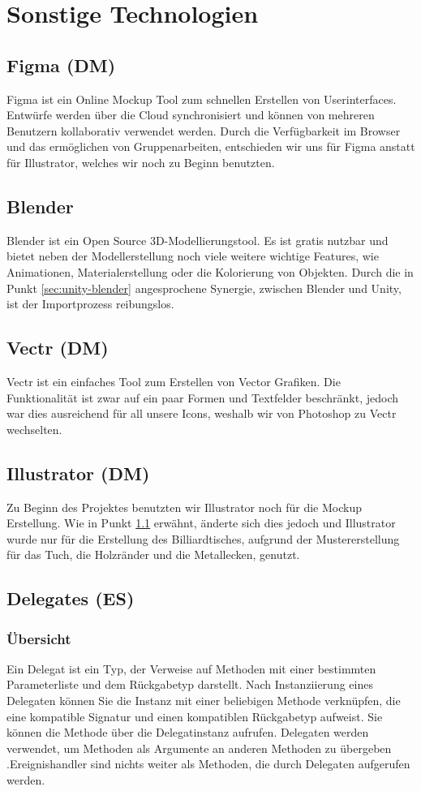 \section{Sonstige Technologien}
\subsection{Figma (DM)} \label{sec:figma}
Figma ist ein Online Mockup Tool zum schnellen Erstellen von Userinterfaces. Entwürfe werden über die Cloud synchronisiert und können von mehreren Benutzern kollaborativ verwendet werden. Durch die Verfügbarkeit im Browser und das ermöglichen von Gruppenarbeiten, entschieden wir uns für Figma anstatt für Illustrator, welches wir noch zu Beginn benutzten.
\subsection{Blender}
Blender ist ein Open Source 3D-Modellierungstool. Es ist gratis nutzbar und bietet neben der Modellerstellung noch viele weitere wichtige Features, wie Animationen, Materialerstellung oder die Kolorierung von Objekten. Durch die in Punkt \ref{sec:unity-blender} angesprochene Synergie, zwischen Blender und Unity, ist der Importprozess reibungslos.
\subsection{Vectr (DM)}
Vectr ist ein einfaches Tool zum Erstellen von Vector Grafiken. Die Funktionalität ist zwar auf ein paar Formen und Textfelder beschränkt, jedoch war dies ausreichend für all unsere Icons, weshalb wir von Photoshop zu Vectr wechselten.
\subsection{Illustrator (DM)}
Zu Beginn des Projektes benutzten wir Illustrator noch für die Mockup Erstellung. Wie in Punkt \ref{sec:figma} erwähnt, änderte sich dies jedoch und Illustrator wurde nur für die Erstellung des Billiardtisches, aufgrund der Mustererstellung für das Tuch, die Holzränder und die Metallecken, genutzt.
\subsection{Delegates (ES)}
\subsubsection{Übersicht}
Ein Delegat ist ein Typ, der Verweise auf Methoden mit einer bestimmten Parameterliste und dem Rückgabetyp darstellt. Nach Instanziierung eines Delegaten können Sie die Instanz mit einer beliebigen Methode verknüpfen, die eine kompatible Signatur und einen kompatiblen Rückgabetyp aufweist. Sie können die Methode über die Delegatinstanz aufrufen.
Delegaten werden verwendet, um Methoden als Argumente an anderen Methoden zu übergeben .Ereignishandler sind nichts weiter als Methoden, die durch Delegaten aufgerufen werden.
